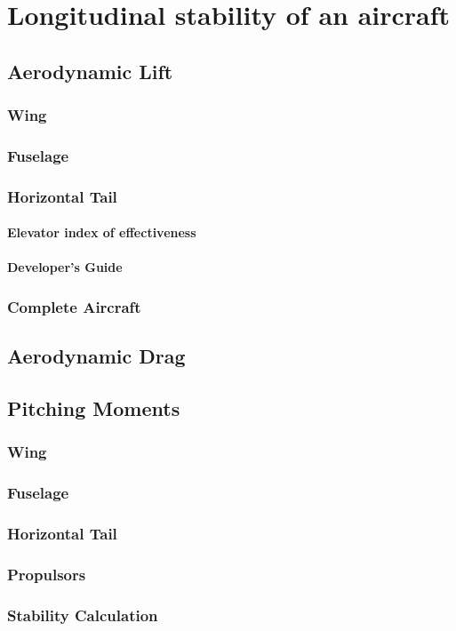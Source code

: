 \chapter{Longitudinal stability of an aircraft}

\section{Aerodynamic Lift}
\subsection{Wing}
\subsection{Fuselage}
\subsection{Horizontal Tail}
\subsubsection{Elevator index of effectiveness}
\subsubsection{Developer's Guide}



\subsection{Complete Aircraft}

\section{Aerodynamic Drag}

\section{Pitching Moments}
\subsection{Wing}
\subsection{Fuselage}
\subsection{Horizontal Tail}
\subsection{Propulsors}

\subsection{Stability Calculation}
